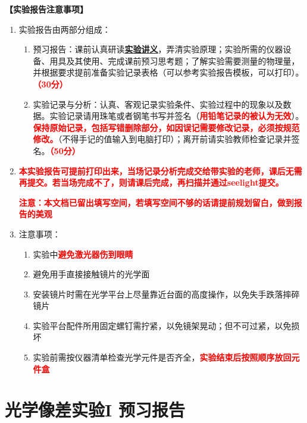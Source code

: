 \documentclass[dvipsnames, svgnames,a4paper,11pt]{article}
\begin{document}
\textbf{【实验报告注意事项】}
\begin{enumerate}[label=\arabic*., leftmargin=*]
	\item 实验报告由两部分组成：
		\begin{enumerate}[label=\arabic*), leftmargin=*]
			\item 预习报告：课前认真研读\underline{\textbf{实验讲义}}，弄清实验原理；实验所需的仪器设备、用具及其使用、完成课前预习思考题；了解实验需要测量的物理量，并根据要求提前准备实验记录表格（可以参考实验报告模板，可以打印）。\textcolor{red}{\textbf{（30分）}}
			\item 实验记录与分析：认真、客观记录实验条件、实验过程中的现象以及数据。实验记录请用珠笔或者钢笔书写并签名（\textcolor{red}{\textbf{用铅笔记录的被认为无效}}）。\textcolor{red}{\textbf{保持原始记录，包括写错删除部分，如因误记需要修改记录，必须按规范修改。}}（不得手记的值输入到电脑打印）；离开前请实验教师检查记录并签名。\textcolor{red}{\textbf{（50分）}}
		\end{enumerate}
	
	\item \textcolor{red}{\textbf{本实验报告可提前打印出来，当场记录分析完成交给带实验的老师，课后无需再提交。若当场完成不了，则请课后完成，再扫描并通过seelight提交。}}
	
	\textcolor{red}{\textbf{注意：本文档已留出填写空间，若填写空间不够的话请提前规划留白，做到报告的美观}}
	\item 注意事项：
		\begin{enumerate}[label=\arabic*), leftmargin=*]
			\item 实验中\textcolor{red}{\textbf{避免激光器伤到眼睛}}
			\item 避免用手直接接触镜片的光学面
			\item 安装镜片时需在光学平台上尽量靠近台面的高度操作，以免失手跌落摔碎镜片
			\item 实验平台配件所用固定螺钉需拧紧，以免镜架晃动；但不可过紧，以免损坏
			\item 实验前需按仪器清单检查光学元件是否齐全，\textcolor{red}{\textbf{实验结束后按照顺序放回元件盒}}
			
		\end{enumerate}
\end{enumerate}


\clearpage
\tableofcontents
\clearpage

\setcounter{section}{0}
\section{光学像差实验I \quad\heiti 预习报告}
	
\end{document}
